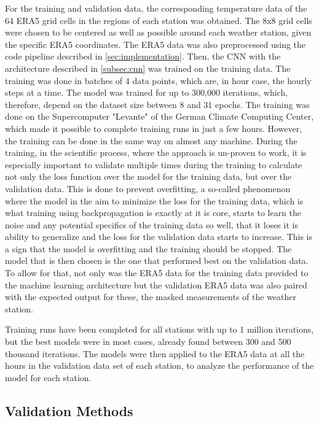 For the training and validation data, the corresponding temperature data of the 64 ERA5 grid cells in the regions of each station was obtained.
The 8x8 grid cells were chosen to be centered as well as possible around each weather station, given the specific ERA5 coordinates.
The ERA5 data was also preprocessed using the code pipeline described in \autoref{sec:implementation}.
Then, the CNN with the architecture described in \autoref{subsec:cnn} was trained on the training data. The training was done in batches of 4 data points, which are, in hour case, the hourly steps at a time. The model was trained for up to 300,000 iterations, which, therefore, depend on the dataset size between 8 and 31 epochs. The training was done on the Supercomputer "Levante" of the German Climate Computing Center, which made it possible to complete training runs in just a few hours. However, the training can be done in the same way on almost any machine. During the training, in the scientific process, where the approach is un-proven to work, it is especially important to validate multiple times during the training to calculate not only the loss function over the model for the training data, but over the validation data. This is done to prevent overfitting, a so-called phenomenon where the model in the aim to minimize the loss for the training data, which is what training using backpropagation is exactly at it is core, starts to learn the noise and any potential specifics of the training data so well, that it loses it is ability to generalize and the loss for the validation data starts to increase. This is a sign that the model is overfitting and the training should be stopped. The model that is then chosen is the one that performed best on the validation data. To allow for that, not only was the ERA5 data for the training data provided to the machine learning architecture but the validation ERA5 data was also paired with the expected output for these, the masked measurements of the weather station.

Training runs have been completed for all stations with up to 1 million iterations, but the best models were in most cases, already found between 300 and 500 thousand iterations. The models were then applied to the ERA5 data at all the hours in the validation data set of each station, to analyze the performance of the model for each station. 

\subsection{Validation Methods}

